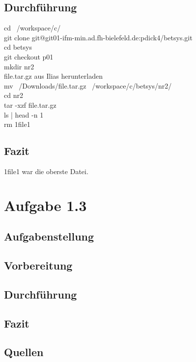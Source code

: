 	\subsection{Durchführung}
		cd ~/workspace/c/\\
		git clone git@git01-ifm-min.ad.fh-bielefeld.de:pdick4/betsys.git\\
		cd betsys\\
		git checkout p01\\
		mkdir nr2\\
		file.tar.gz aus Ilias herunterladen\\
		mv ~/Downloads/file.tar.gz ~/workspace/c/betsys/nr2/\\
		cd nr2\\
		tar -xzf file.tar.gz\\
		ls | head -n 1\\
		rm 1file1\\
	\subsection{Fazit}
		1file1 war die oberste Datei.
\section{Aufgabe 1.3}
\subsection{Aufgabenstellung}
\subsection{Vorbereitung}
\subsection{Durchführung}
\subsection{Fazit}
\subsection{Quellen}